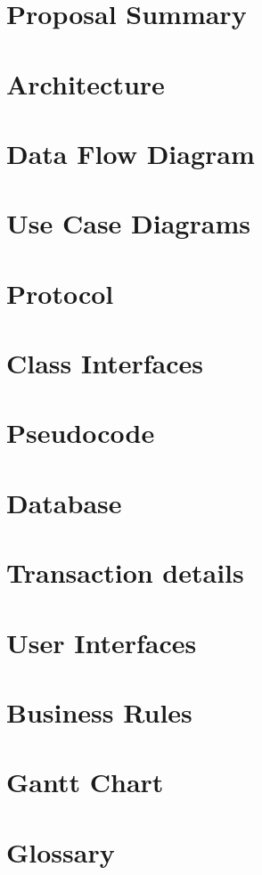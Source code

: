 \chapter{Proposal Summary}


\chapter{Architecture}


\chapter{Data Flow Diagram}


\chapter{Use Case Diagrams}


\chapter{Protocol}


\chapter{Class Interfaces}


\chapter{Pseudocode}


\chapter{Database}


\chapter{Transaction details}


\chapter{User Interfaces}


\chapter{Business Rules}


%

\chapter{Gantt Chart}


\chapter{Glossary}

